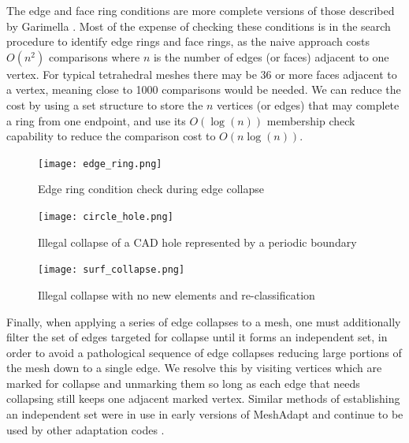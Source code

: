 The edge and face ring conditions are more complete versions of those described
by Garimella \cite{garimella1999anisotropic}.
Most of the expense of checking these conditions is in the search procedure
to identify edge rings and face rings, as the naive approach costs $O(n^2)$
comparisons where $n$ is the number of edges (or faces) adjacent to one vertex.
For typical tetrahedral meshes there may be 36 or more faces adjacent to a vertex,
meaning close to 1000 comparisons would be needed.
We can reduce the cost by using a set structure to store the $n$ vertices (or edges)
that may complete a ring from one endpoint, and use its $O(\log(n))$ membership check
capability to reduce the comparison cost to $O(n\log(n))$.

\begin{figure}
\begin{center}
\texttt{[image: edge\_ring.png]}
\caption{Edge ring condition check during edge collapse}
\label{fig:edge_ring}
\end{center}
\end{figure}

\begin{figure}
\begin{center}
\texttt{[image: circle\_hole.png]}
\caption{Illegal collapse of a CAD hole represented by a periodic boundary}
\label{fig:circle_hole}
\end{center}
\end{figure}

\begin{figure}
\begin{center}
\texttt{[image: surf\_collapse.png]}
\caption{Illegal collapse with no new elements and re-classification}
\label{fig:surf_collapse}
\end{center}
\end{figure}

Finally, when applying a series of edge collapses to a mesh, one
must additionally filter the set of edges targeted for collapse
until it forms an independent set, in order to avoid a pathological
sequence of edge collapses reducing large portions of the mesh
down to a single edge.
We resolve this by visiting vertices which are marked for collapse
and unmarking them so long as each edge that needs collapsing
still keeps one adjacent marked vertex.
Similar methods of establishing an independent set were
in use in early versions of MeshAdapt \cite{de1999parallel}
and continue to be used by other adaptation codes
\cite{michal2012anisotropic}.

